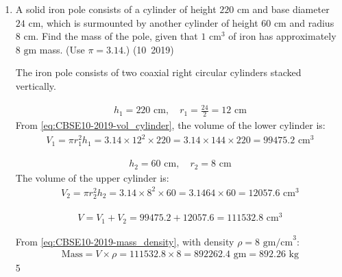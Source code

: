\begin{enumerate}[label=\thesubsection.\arabic*, ref=\thesubsection.\theenumi]
	The following code generates the geometric construction:
	\begin{lstlisting}[frame=single, basicstyle=\ttfamily\small]
		codes/q36.py
	\end{lstlisting}
	


	\item A solid iron pole consists of a cylinder of height $220\text{ cm}$ and base diameter $24\text{ cm}$, which is surmounted by another cylinder of height $60\text{ cm}$ and radius $8\text{ cm}$. Find the mass of the pole, given that $1\text{ cm}^3$ of iron has approximately $8\text{ gm}$ mass. (Use $\pi=3.14$.)
	\hfill (10~2019)
	
	\solution
	The iron pole consists of two coaxial right circular cylinders stacked vertically.
	
	\begin{align}
		h_1 = 220\text{ cm}, \quad r_1 = \frac{24}{2} = 12\text{ cm}
	\end{align}
	From \eqref{eq:CBSE10-2019-vol_cylinder}, the volume of the lower cylinder is:
	\begin{align}
		V_1 = \pi r_1^2 h_1 = 3.14 \times 12^2 \times 220 = 3.14 \times 144 \times 220 = 99475.2\text{ cm}^3
	\end{align}
	
	\begin{align}
		h_2 = 60\text{ cm}, \quad r_2 = 8\text{ cm}
	\end{align}
	The volume of the upper cylinder is:
	\begin{align}
		V_2 = \pi r_2^2 h_2 = 3.14 \times 8^2 \times 60 = 3.14 \text{64} \times 60 = 12057.6\text{ cm}^3
	\end{align}
	
	\begin{align}
		V = V_1 + V_2 = 99475.2 + 12057.6 = 111532.8\text{ cm}^3
	\end{align}
	
	From \eqref{eq:CBSE10-2019-mass_density}, with density $\rho = 8\text{ gm/cm}^3$:
	\begin{align}
		\text{Mass} = V \times \rho = 111532.8 \times 8 = 892262.4\text{ gm} = 892.26\text{ kg}
	\end{align}5
	
	
\end{enumerate}